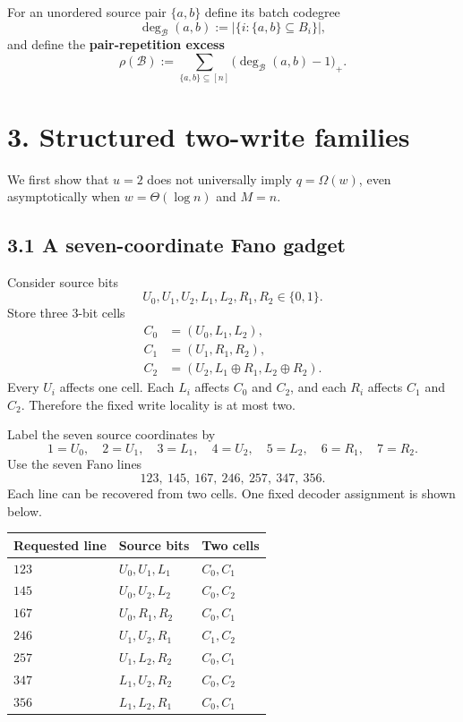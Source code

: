 \documentclass[
]{article}
\begin{document}
For an unordered source pair \(\{a,b\}\) define its batch codegree \[
\deg_{\mathcal B}(a,b):=|\{i:\{a,b\}\subseteq B_i\}|,
\] and define the \textbf{pair-repetition excess} \[
\rho(\mathcal B)
:=
\sum_{\{a,b\}\subseteq[n]}
\bigl(\deg_{\mathcal B}(a,b)-1\bigr)_+.
\]

\hypertarget{structured-two-write-families}{%
\section{3. Structured two-write
families}\label{structured-two-write-families}}

We first show that \(u=2\) does not universally imply \(q=\Omega(w)\),
even asymptotically when \(w=\Theta(\log n)\) and \(M=n\).

\hypertarget{a-seven-coordinate-fano-gadget}{%
\subsection{3.1 A seven-coordinate Fano
gadget}\label{a-seven-coordinate-fano-gadget}}

Consider source bits \[
U_0,U_1,U_2,L_1,L_2,R_1,R_2\in\{0,1\}.
\] Store three 3-bit cells \[
\begin{aligned}
C_0&=(U_0,L_1,L_2),\\
C_1&=(U_1,R_1,R_2),\\
C_2&=(U_2,L_1\oplus R_1,L_2\oplus R_2).
\end{aligned}
\] Every \(U_i\) affects one cell. Each \(L_i\) affects \(C_0\) and
\(C_2\), and each \(R_i\) affects \(C_1\) and \(C_2\). Therefore the
fixed write locality is at most two.

Label the seven source coordinates by \[
1=U_0,\quad 2=U_1,\quad 3=L_1,\quad 4=U_2,\quad
5=L_2,\quad 6=R_1,\quad 7=R_2.
\] Use the seven Fano lines \[
123,\ 145,\ 167,\ 246,\ 257,\ 347,\ 356.
\] Each line can be recovered from two cells. One fixed decoder
assignment is shown below.

\begin{longtable}[]{@{}lll@{}}
\toprule\noalign{}
Requested line & Source bits & Two cells \\
\midrule\noalign{}
\endhead
\bottomrule\noalign{}
\endlastfoot
\(123\) & \(U_0,U_1,L_1\) & \(C_0,C_1\) \\
\(145\) & \(U_0,U_2,L_2\) & \(C_0,C_2\) \\
\(167\) & \(U_0,R_1,R_2\) & \(C_0,C_1\) \\
\(246\) & \(U_1,U_2,R_1\) & \(C_1,C_2\) \\
\(257\) & \(U_1,L_2,R_2\) & \(C_0,C_1\) \\
\(347\) & \(L_1,U_2,R_2\) & \(C_0,C_2\) \\
\(356\) & \(L_1,L_2,R_1\) & \(C_0,C_1\) \\
\end{longtable}
\end{document}
